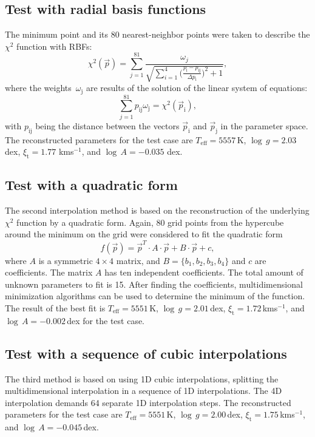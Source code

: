 \documentclass{aa}
\newcommand{\kmos}{kms$^{-1}$}
\begin{document}
\subsection{Test with radial basis functions}
The minimum point and its 80  nearest-neighbor points were taken  
 to describe the $\chi^2$ function with RBFs:
%
\begin{equation}
    \chi^2(\vec p)=\sum_{j=1}^{81} 
    \frac{\omega_j} { \sqrt{ \sum_{i=1}^4 
    \Big ( \frac{p_\mathrm{i} - p_\mathrm{ij}}{\Delta p_\mathrm{i}}
    \Big)^2 +1}},
\end{equation}
%
where the weights~$\omega_\mathrm{j}$ are results of 
the solution of the linear system of equations:  
\begin{equation}
    \sum_{j=1}^{81} p_\mathrm{ij} \omega_\mathrm{j} =  
    \chi^2(\vec p_\mathrm{i}), 
\end{equation}
%
with $p_\mathrm{ij}$ being the distance between the vectors
$\vec p_\mathrm{i}$ and $\vec p_\mathrm{j}$ in the parameter
space. %
The reconstructed parameters for the test case are 
$T_\mathrm{eff}=5557$\,K, $\log\,g=2.03$ dex, 
$\xi_\mathrm{t}=1.77$ \kmos, and  $\log\,A=-0.035$ dex. 

\subsection{Test with a quadratic form}
The second interpolation method is based
on the reconstruction of the underlying $\chi^2$ 
function by a quadratic form. Again, 80 grid 
points from the hypercube around the  
minimum on the grid were considered 
to fit the  quadratic form%
\begin{equation}
f(\vec p)=\vec p^T\cdot A \cdot  \vec p +
B \cdot  \vec p +c ,
\end{equation}
%
where $A$ is a symmetric $4 \times 4$ matrix, and 
$B=\big\{b_1, b_2,b_3,b_4\big\}$ and $c$ are 
coefficients. The matrix $A$ has ten independent 
coefficients. The total amount of unknown parameters 
to fit is 15. After finding the  coefficients, multidimensional minimization 
algorithms can be used to determine the minimum of the function. 
The result of the best fit is 
$T_\mathrm{eff}=5551$\,K, $\log\,g=2.01$\,dex, 
$\xi_\mathrm{t}=1.72$\,\kmos, and $\log\, A=-0.002$\,dex 
 for the test case.

\subsection{Test with a sequence of cubic interpolations} 
The third method is based on using 1D cubic interpolations, splitting the
multidimensional interpolation in a sequence of 1D interpolations. The
4D interpolation demands 64 separate 1D
interpolation steps. The reconstructed parameters for the test case are
$T_\mathrm{eff}=5551$\,K, $\log \,g=2.00$\,dex,
$\xi_\mathrm{t}=1.75$\,\kmos, and $\log\,A=-0.045$\,dex.
\end{document}
